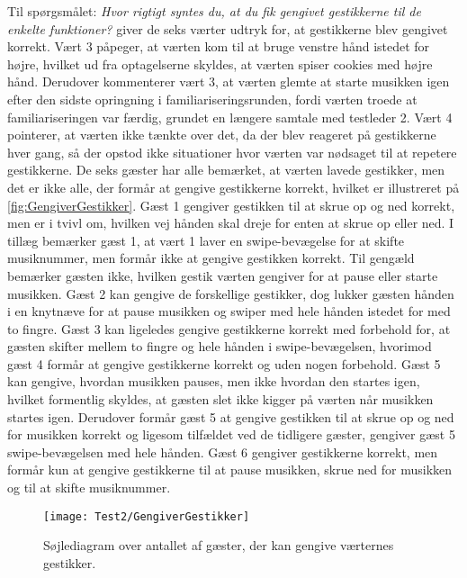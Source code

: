 Til spørgsmålet: \textit{Hvor rigtigt syntes du, at du fik gengivet gestikkerne til de enkelte funktioner?} giver de seks værter udtryk for, at gestikkerne blev gengivet korrekt. Vært 3 påpeger, at værten kom til at bruge venstre hånd istedet for højre, hvilket ud fra optagelserne skyldes, at værten spiser cookies med højre hånd. Derudover kommenterer vært 3, at værten glemte at starte musikken igen efter den sidste opringning i familiariseringsrunden, fordi værten troede at familiariseringen var færdig, grundet en længere samtale med testleder 2. Vært 4 pointerer, at værten ikke tænkte over det, da der blev reageret på gestikkerne hver gang, så der opstod ikke situationer hvor værten var nødsaget til at repetere gestikkerne. \blankline
%
De seks gæster har alle bemærket, at værten lavede gestikker, men det er ikke alle, der formår at gengive gestikkerne korrekt, hvilket er illustreret på \autoref{fig:GengiverGestikker}. Gæst 1 gengiver gestikken til at skrue op og ned korrekt, men er i tvivl om, hvilken vej hånden skal dreje for enten at skrue op eller ned. I tillæg bemærker gæst 1, at vært 1 laver en swipe-bevægelse for at skifte musiknummer, men formår ikke at gengive gestikken korrekt. Til gengæld bemærker gæsten ikke, hvilken gestik værten gengiver for at pause eller starte musikken. Gæst 2 kan gengive de forskellige gestikker, dog lukker gæsten hånden i en knytnæve for at pause musikken og swiper med hele hånden istedet for med to fingre. Gæst 3 kan ligeledes gengive gestikkerne korrekt med forbehold for, at gæsten skifter mellem to fingre og hele hånden i swipe-bevægelsen, hvorimod gæst 4 formår at gengive gestikkerne korrekt og uden nogen forbehold. Gæst 5 kan gengive, hvordan musikken pauses, men ikke hvordan den startes igen, hvilket formentlig skyldes, at gæsten slet ikke kigger på værten når musikken startes igen. Derudover formår gæst 5 at gengive gestikken til at skrue op og ned for musikken korrekt og ligesom tilfældet ved de tidligere gæster, gengiver gæst 5 swipe-bevægelsen med hele hånden. Gæst 6 gengiver gestikkerne korrekt, men formår kun at gengive gestikkerne til at pause musikken, skrue ned for musikken og til at skifte musiknummer. 
%
\begin{figure}[H]
	\centering
	\texttt{[image: Test2/GengiverGestikker]}
	\caption{Søjlediagram over antallet af gæster, der kan gengive værternes gestikker.}
	\label{fig:GengiverGestikker}
\end{figure}
\noindent
% 
